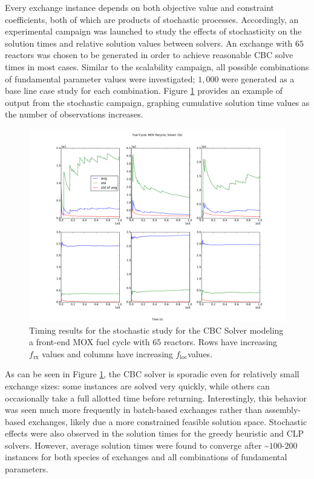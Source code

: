 \documentclass{anstrans}
\newcommand{\frx}{$f_{\text{rx}}$}
\newcommand{\floc}{$f_{\text{loc}}$}
\begin{document}
Every exchange instance depends on both objective value and constraint
coefficients, both of which are products of stochastic processes. Accordingly,
an experimental campaign was launched to study the effects of stochasticity on
the solution times and relative solution values between solvers. An exchange
with $65$ reactors was chosen to be generated in order to achieve reasonable CBC
solve times in most cases. Similar to the scalability campaign, all possible
combinations of fundamental parameter values were investigated; $1,000$ were
generated as a base line case study for each combination. Figure
\ref{fig:cbc_stochastic} provides an example of output from the stochastic
campaign, graphing cumulative solution time values as the number of observations
increases.

\begin{figure}
  \begin{center}
    \includegraphics[width=1.5\columnwidth]{1k_avg_front_time_fc1_solvercbc.pdf}
    \caption[]{
      \label{fig:cbc_stochastic}
      Timing results for the stochastic study for the CBC Solver modeling a
      front-end MOX fuel cycle with $65$ reactors. Rows have increasing \frx
      values and columns have increasing \floc values.  }
  \end{center}
\end{figure}

As can be seen in Figure \ref{fig:cbc_stochastic}, the CBC solver is sporadic
even for relatively small exchange sizes: some instances are solved very
quickly, while others can occasionally take a full allotted time before
returning. Interestingly, this behavior was seen much more frequently in
batch-based exchanges rather than assembly-based exchanges, likely due a more
constrained feasible solution space. Stochastic effects were also observed in
the solution times for the greedy heuristic and CLP solvers. However, average
solution times were found to converge after \textasciitilde$100$-$200$ instances
for both species of exchanges and all combinations of fundamental parameters.
\end{document}
